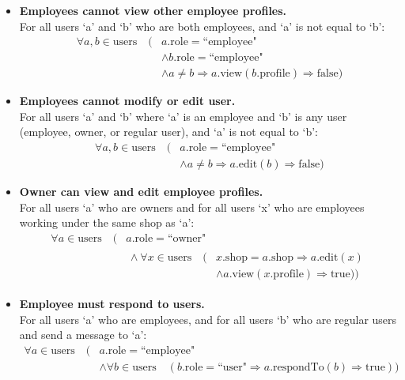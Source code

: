 \documentclass[12pt]{article}
\begin{document}
\begin{itemize}
    \item \textbf{Employees cannot view other employee profiles.}\\ 
    For all users `a' and `b' who are both employees, and `a' is not equal to `b':
    \[
    \begin{split}
        \forall a, b \in \text{users} \quad (& a.\text{role} = \text{``employee"}\\ 
        & \land b.\text{role} = \text{``employee"} \\ 
        & \land a \neq b \Rightarrow a.\text{view}(b.\text{profile}) \Rightarrow \text{false})
    \end{split}
    \]
    
    \item \textbf{Employees cannot modify or edit user.}\\
    For all users `a' and `b' where `a' is an employee and `b' is any user (employee, owner, or regular user), and `a' is not equal to `b':
    \[
    \begin{split}
        \forall a, b \in \text{users} \quad (& a.\text{role} = \text{``employee"} \\ 
        & \land a \neq b \Rightarrow a.\text{edit}(b) \Rightarrow \text{false})
    \end{split}
    \]

    \item \textbf{Owner can view and edit employee profiles.}\\
    For all users `a' who are owners and for all users `x' who are employees working under the same shop as `a':
    \[
    \begin{split}
        \forall a \in \text{users} \quad (& a.\text{role} = \text{``owner"} \\ 
        & \begin{split} 
            \land \: \forall x \in \text{users} \quad (& x.\text{shop} = a.\text{shop} \Rightarrow a.\text{edit}(x) \\ & \land a.\text{view}(x.\text{profile}) \Rightarrow \text{true}))
        \end{split}
    \end{split}
    \]
    
    \item \textbf{Employee must respond to users.}\\
    For all users `a' who are employees, and for all users `b' who are regular users and send a message to `a':
    \[
    \begin{split}
        \forall a \in \text{users} \quad (& a.\text{role} = \text{``employee"} \\ 
        & \land \forall b \in \text{users} \quad (b.\text{role} = \text{``user"} \Rightarrow a.\text{respondTo}(b) \Rightarrow \text{true}))
    \end{split}
    \]


\end{itemize}
\end{document}

